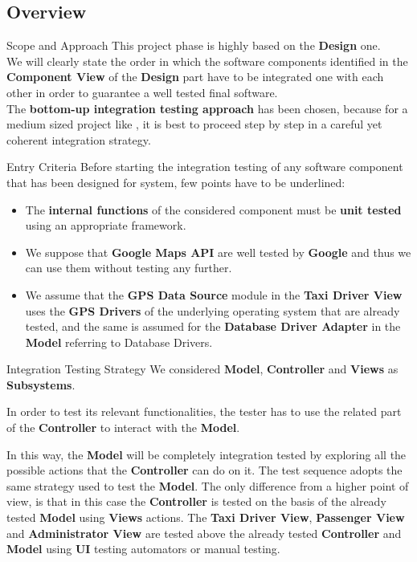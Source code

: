 \documentclass{../common/latex_classes/pdf_presentation}
\begin{document}
	\subsection{Overview}
	\begin{frame}{Scope and Approach}
		This project phase is highly based on the \textbf{Design} one. \\
		\medskip
		We will clearly state the order in which the software components identified in the \textbf{Component View} of the \textbf{Design} part have to be integrated one with each other in order to guarantee a well tested final software.\\
		\medskip
		The \textbf{bottom-up integration testing approach} has been chosen, because for a medium sized project like \myTaxiService{}, it is best to proceed step by step in a careful yet coherent integration strategy.\\
	\end{frame}
	\begin{frame}{Entry Criteria}
		Before starting the integration testing of any software component that has been designed for \myTaxiService{} system, few points have to be underlined:
		\begin{itemize}
			 \item The \textbf{internal functions} of the considered component must be \textbf{unit tested} using an appropriate framework.
			 \item We suppose that \textbf{Google Maps API} are well tested by \textbf{Google} and thus we can use them without testing any
			 further.
			 \item We assume that the \textbf{GPS Data Source} module in the \textbf{Taxi Driver View} uses the \textbf{GPS Drivers} of the underlying operating system that are already tested, and the same is assumed for the \textbf{Database Driver Adapter} in the \textbf{Model} referring to Database Drivers.
		\end{itemize}
	\end{frame}
	\begin{frame}{Integration Testing Strategy}
		We considered \textbf{Model}, \textbf{Controller} and \textbf{Views} as \textbf{Subsystems}. \\
		\medskip
		\begin{itemize}
			 In order to test its relevant functionalities, the tester has to use the related part of the \textbf{Controller} to interact with the \textbf{Model}.\par
			In this way, the \textbf{Model} will be completely integration tested by exploring all the possible actions that the \textbf{Controller} can do on it.
			 The test sequence adopts the same strategy used to test the \textbf{Model}. The only difference from a higher point of view, is that in this case the \textbf{Controller} is tested on the basis of the already tested \textbf{Model} using \textbf{Views} actions.
			 The \textbf{Taxi Driver View}, \textbf{Passenger View} and \textbf{Administrator View} are tested above the already tested \textbf{Controller} and \textbf{Model} using \textbf{UI} testing automators or manual testing.
		\end{itemize}
	\end{frame}
\end{document}
